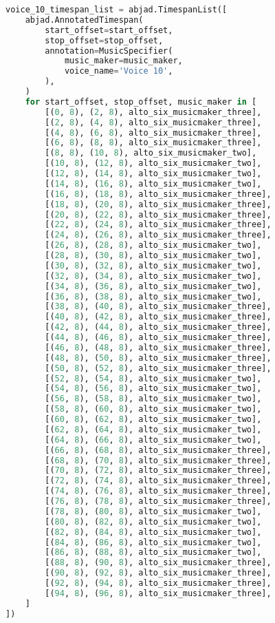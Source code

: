 \begin{lstlisting}[language=Python, caption=Invocation Source Code]
voice_10_timespan_list = abjad.TimespanList([
    abjad.AnnotatedTimespan(
        start_offset=start_offset,
        stop_offset=stop_offset,
        annotation=MusicSpecifier(
            music_maker=music_maker,
            voice_name='Voice 10',
        ),
    )
    for start_offset, stop_offset, music_maker in [
        [(0, 8), (2, 8), alto_six_musicmaker_three],
        [(2, 8), (4, 8), alto_six_musicmaker_three],
        [(4, 8), (6, 8), alto_six_musicmaker_three],
        [(6, 8), (8, 8), alto_six_musicmaker_three],
        [(8, 8), (10, 8), alto_six_musicmaker_two],
        [(10, 8), (12, 8), alto_six_musicmaker_two],
        [(12, 8), (14, 8), alto_six_musicmaker_two],
        [(14, 8), (16, 8), alto_six_musicmaker_two],
        [(16, 8), (18, 8), alto_six_musicmaker_three],
        [(18, 8), (20, 8), alto_six_musicmaker_three],
        [(20, 8), (22, 8), alto_six_musicmaker_three],
        [(22, 8), (24, 8), alto_six_musicmaker_three],
        [(24, 8), (26, 8), alto_six_musicmaker_three],
        [(26, 8), (28, 8), alto_six_musicmaker_two],
        [(28, 8), (30, 8), alto_six_musicmaker_two],
        [(30, 8), (32, 8), alto_six_musicmaker_two],
        [(32, 8), (34, 8), alto_six_musicmaker_two],
        [(34, 8), (36, 8), alto_six_musicmaker_two],
        [(36, 8), (38, 8), alto_six_musicmaker_two],
        [(38, 8), (40, 8), alto_six_musicmaker_three],
        [(40, 8), (42, 8), alto_six_musicmaker_three],
        [(42, 8), (44, 8), alto_six_musicmaker_three],
        [(44, 8), (46, 8), alto_six_musicmaker_three],
        [(46, 8), (48, 8), alto_six_musicmaker_three],
        [(48, 8), (50, 8), alto_six_musicmaker_three],
        [(50, 8), (52, 8), alto_six_musicmaker_three],
        [(52, 8), (54, 8), alto_six_musicmaker_two],
        [(54, 8), (56, 8), alto_six_musicmaker_two],
        [(56, 8), (58, 8), alto_six_musicmaker_two],
        [(58, 8), (60, 8), alto_six_musicmaker_two],
        [(60, 8), (62, 8), alto_six_musicmaker_two],
        [(62, 8), (64, 8), alto_six_musicmaker_two],
        [(64, 8), (66, 8), alto_six_musicmaker_two],
        [(66, 8), (68, 8), alto_six_musicmaker_three],
        [(68, 8), (70, 8), alto_six_musicmaker_three],
        [(70, 8), (72, 8), alto_six_musicmaker_three],
        [(72, 8), (74, 8), alto_six_musicmaker_three],
        [(74, 8), (76, 8), alto_six_musicmaker_three],
        [(76, 8), (78, 8), alto_six_musicmaker_three],
        [(78, 8), (80, 8), alto_six_musicmaker_two],
        [(80, 8), (82, 8), alto_six_musicmaker_two],
        [(82, 8), (84, 8), alto_six_musicmaker_two],
        [(84, 8), (86, 8), alto_six_musicmaker_two],
        [(86, 8), (88, 8), alto_six_musicmaker_two],
        [(88, 8), (90, 8), alto_six_musicmaker_three],
        [(90, 8), (92, 8), alto_six_musicmaker_three],
        [(92, 8), (94, 8), alto_six_musicmaker_three],
        [(94, 8), (96, 8), alto_six_musicmaker_three],
    ]
])


\end{lstlisting}
